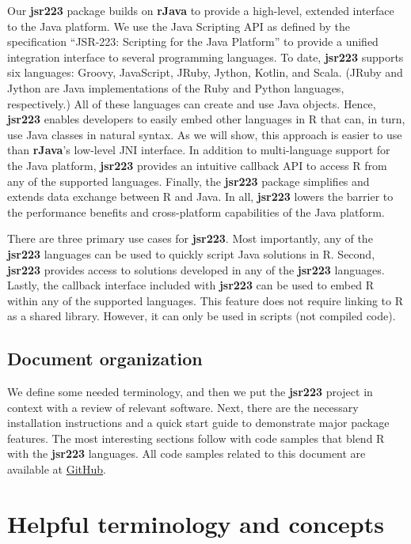 Our \textbf{jsr223} package builds on \textbf{rJava} to provide a high-level, extended interface to the Java platform. We use the Java Scripting API \citep{jsa} as defined by the specification “JSR-223: Scripting for the Java Platform” \citep{jsr223spec} to provide a unified integration interface to several programming languages. To date, \textbf{jsr223} supports six languages: Groovy, JavaScript, JRuby, Jython, Kotlin, and Scala. (JRuby and Jython are Java implementations of the Ruby and Python languages, respectively.) All of these languages can create and use Java objects. Hence, \textbf{jsr223} enables developers to easily embed other languages in R that can, in turn, use Java classes in natural syntax. As we will show, this approach is easier to use than \textbf{rJava}'s low-level JNI interface. In addition to multi-language support for the Java platform, \textbf{jsr223} provides an intuitive callback API to access R from any of the supported languages. Finally, the \textbf{jsr223} package simplifies and extends data exchange between R and Java. In all, \textbf{jsr223} lowers the barrier to the performance benefits and cross-platform capabilities of the Java platform.

There are three primary use cases for \textbf{jsr223}. Most importantly, any of the \textbf{jsr223} languages can be used to quickly script Java solutions in R. Second, \textbf{jsr223} provides access to solutions developed in any of the \textbf{jsr223} languages. Lastly, the callback interface included with \textbf{jsr223} can be used to embed R within any of the supported languages. This feature does not require linking to R as a shared library. However, it can only be used in scripts (not compiled code).

\subsection{Document organization}

We define some needed terminology, and then we put the \textbf{jsr223} project in context with a review of relevant software. Next, there are the necessary installation instructions and a quick start guide to demonstrate major package features. The most interesting sections follow with code samples that blend R with the \textbf{jsr223} languages. All code samples related to this document are available at \href{http://notavalidaddresss////}{GitHub}.

\section{Helpful terminology and concepts}


